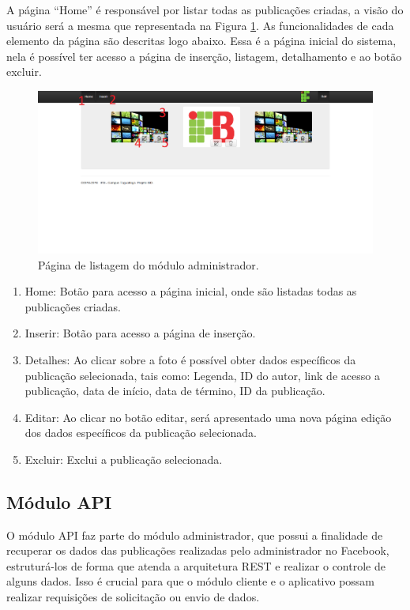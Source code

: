A página ``Home'' é responsável por listar todas as publicações criadas, a visão do usuário será a mesma que representada na Figura \ref{fig:administrador2}. As funcionalidades de cada elemento da página são descritas logo abaixo. Essa é a página inicial do sistema, nela é possível ter acesso a página de inserção, listagem, detalhamento e ao botão excluir.

\begin{figure}[H]
\centering
\includegraphics[scale=0.4]{figuras/administrador2}
\caption{Página de listagem  do módulo administrador.}
\label{fig:administrador2}
\end{figure}

\begin{enumerate}
   \item Home: Botão para acesso a página inicial, onde são listadas todas as publicações criadas.
   \item Inserir: Botão para acesso a página de inserção.
   \item Detalhes: Ao clicar sobre a foto é possível obter dados específicos da publicação selecionada, tais como: Legenda, ID do autor, link de acesso a publicação, data de início, data de término, ID da publicação.
   \item Editar: Ao clicar no botão editar, será apresentado uma nova página edição dos dados específicos da publicação selecionada.
   \item Excluir: Exclui a publicação selecionada.
 \end{enumerate}

\subsection{Módulo API}
O módulo API faz parte do módulo administrador, que possui a finalidade de recuperar os dados das publicações realizadas pelo administrador no Facebook, estruturá-los de forma que atenda a arquitetura REST e realizar o controle de alguns dados. Isso é crucial para que o módulo cliente e o aplicativo possam realizar requisições de solicitação ou envio de dados.

